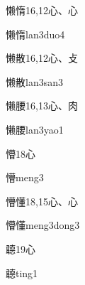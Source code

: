 \begin{Entry}{懒惰}{16,12}{⼼、⼼}
  \begin{Phonetics}{懒惰}{lan3duo4}
  \end{Phonetics}
\end{Entry}

\begin{Entry}{懒散}{16,12}{⼼、⽁}
  \begin{Phonetics}{懒散}{lan3san3}
  \end{Phonetics}
\end{Entry}

\begin{Entry}{懒腰}{16,13}{⼼、⾁}
  \begin{Phonetics}{懒腰}{lan3yao1}
  \end{Phonetics}
\end{Entry}

\begin{Entry}{懵}{18}{⼼}
  \begin{Phonetics}{懵}{meng3}
  \end{Phonetics}
\end{Entry}

\begin{Entry}{懵懂}{18,15}{⼼、⼼}
  \begin{Phonetics}{懵懂}{meng3dong3}
  \end{Phonetics}
\end{Entry}

\begin{Entry}{聼}{19}{⼼}
  \begin{Phonetics}{聼}{ting1}
  \end{Phonetics}
\end{Entry}


